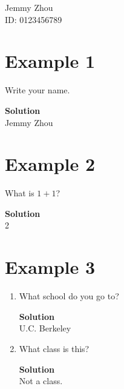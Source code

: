 \documentclass[11pt]{article}
\newcommand*{\Question}[1]{\section{#1}}
\newenvironment{Parts}{\begin{enumerate}[label=(\alph*)]}{\end{enumerate}}
\newcommand*{\Part}{\item}
\newenvironment{Answer}{\newline\vspace{10pt}\begin{mdframed}\color{blue}\textbf{Solution}\\}{\end{mdframed}\vfill\pagebreak[3]}
\newenvironment{Answer}{\color{blue}\newline\textbf{Solution}\\\vspace{10pt}}{\vfill\pagebreak[3]}
\begin{document}
	\begin{center}
		Jemmy Zhou \\ %
		ID: 0123456789 %
	\end{center}
	
	
	\Question{Example 1}
	Write your name.
	\begin{Answer}
		Jemmy Zhou
	\end{Answer}
	
	\Question{Example 2}
	What is $1 + 1$?
	\begin{Answer}
		2
	\end{Answer}
	
	\Question{Example 3}
	\begin{Parts}
		\Part What school do you go to?
		\begin{Answer}
			U.C. Berkeley
		\end{Answer}
		\Part What class is this?
		\begin{Answer}
			Not a class.
		\end{Answer}
	\end{Parts}
\end{document}
